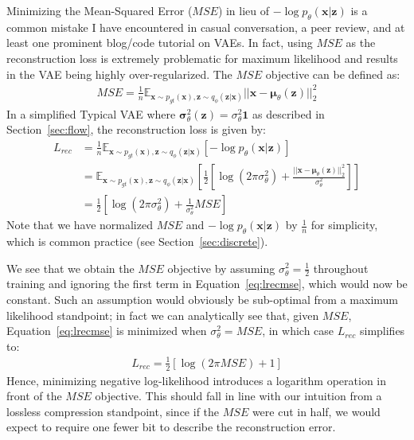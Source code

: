 \documentclass{article}
\begin{document}
Minimizing the Mean-Squared Error ($MSE$) in lieu of $-\log p_\theta(\mathbf{x}|\mathbf{z})$ is a common mistake I have encountered in casual conversation, a  peer review, and at least one prominent blog/code tutorial on VAEs.
In fact, using $MSE$ as the reconstruction loss is extremely problematic for maximum likelihood and results in the VAE being highly over-regularized. 
The $MSE$ objective can be defined as:
\begin{align}
    MSE = \frac{1}{n}\mathbb{E}_{\mathbf{x}\sim p_{gt}(\mathbf{x}), \mathbf{z} \sim q_\phi(\mathbf{z}|\mathbf{x})} ||\mathbf{x} - \boldsymbol \mu_\theta(\mathbf{z})||_2^2
\end{align}
In a simplified Typical VAE where $\boldsymbol \sigma^2_\theta(\mathbf{z}) = \sigma^2_\theta \mathbf{1}$ as described in Section~\ref{sec:flow}, the reconstruction loss is given by:
\begin{align}
    L_{rec} &=  \frac{1}{n}\mathbb{E}_{\mathbf{x}\sim p_{gt}(\mathbf{x}), \mathbf{z} \sim q_\phi(\mathbf{z}|\mathbf{x})}[-\log p_\theta(\mathbf{x}|\mathbf{z})]\\
    &= \mathbb{E}_{\mathbf{x}\sim p_{gt}(\mathbf{x}), \mathbf{z} \sim q_\phi(\mathbf{z}|\mathbf{x})} [ \frac{1}{2}[\log(2\pi\sigma_\theta^2)+\frac{||\mathbf{x}-\boldsymbol \mu_\theta(\mathbf{z})||_2^2}{\sigma_\theta^2}] ]\\
    &=\frac{1}{2}[\log(2\pi\sigma_\theta^2) + \frac{1}{\sigma_\theta^2} MSE] \label{eq:lrecmse}
\end{align}
Note that we have normalized $MSE$ and $-\log p_\theta(\mathbf{x}|\mathbf{z})$ by $\frac{1}{n}$ for simplicity, which is common practice (see Section~\ref{sec:discrete}).

We see that we obtain the $MSE$ objective by assuming $\sigma^2_\theta=\frac{1}{2}$ throughout training and ignoring the first term in Equation~\ref{eq:lrecmse}, which would now be constant.
Such an assumption would obviously be sub-optimal from a maximum likelihood standpoint; in fact we can analytically see that, given $MSE$, Equation~\ref{eq:lrecmse} is minimized when $\sigma^2_\theta = MSE$, in which case $L_{rec}$ simplifies to:
\begin{align}
    L_{rec} = \frac{1}{2}[\log(2 \pi MSE)+1] \label{eq:logmse}
\end{align}
Hence, minimizing negative log-likelihood introduces a logarithm operation in front of the $MSE$ objective.
This should fall in line with our intuition from a lossless compression standpoint, since if the $MSE$ were cut in half, we would expect to require one fewer bit to describe the reconstruction error.
\end{document}
